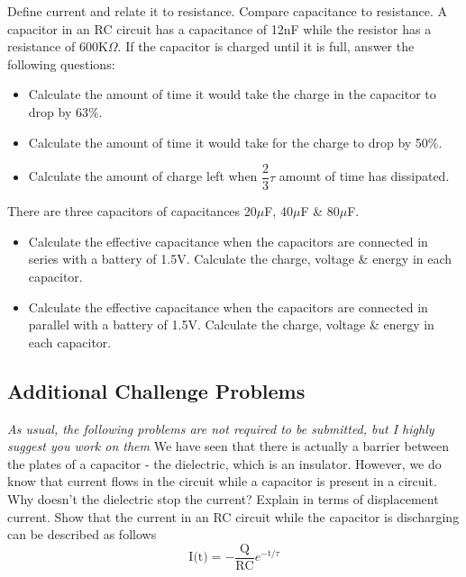 \documentclass[9pt,addpoints]{exam}
\begin{document}
	\begin{questions}
		\question Define current and relate it to resistance. Compare capacitance to resistance.
		\question A capacitor in an RC circuit has a capacitance of 12nF while the resistor has a resistance of 600K$\Omega$. If the capacitor is charged until it is full, answer the following questions:
		\begin{itemize}
			\item Calculate the amount of time it would take the charge in the capacitor to drop by 63\%.
			\item Calculate the amount of time it would take for the charge to drop by 50\%.
			\item Calculate the amount of charge left when $\dfrac{2}{3}\tau$ amount of time has dissipated.
		\end{itemize}
		\question There are three capacitors of capacitances 20$\mu$F, 40$\mu$F \& 80$\mu$F.
		\begin{itemize}
			\item Calculate the effective capacitance when the capacitors are connected in series with a battery of 1.5V. Calculate the charge, voltage \& energy in each capacitor.
			\item Calculate the effective capacitance when the capacitors are connected in parallel with a battery of 1.5V. Calculate the charge, voltage \& energy in each capacitor.
		\end{itemize}
		\subsection*{Additional Challenge Problems}
		\textit{As usual, the following problems are not required to be submitted, but I highly suggest you work on them} 
		\question We have seen that there is actually a barrier between the plates of a capacitor - the dielectric, which is an insulator. However, we do know that current flows in the circuit while a capacitor is present in a circuit. Why doesn't the dielectric stop the current? Explain in terms of displacement current.
		\question Show that the current in an RC circuit while the capacitor is discharging can be described as follows 
		$$\text{I(t)} = - \frac{\text{Q}}{\text{RC}}e^{-\text{t}/\tau}$$
	\end{questions}		
\end{document}
